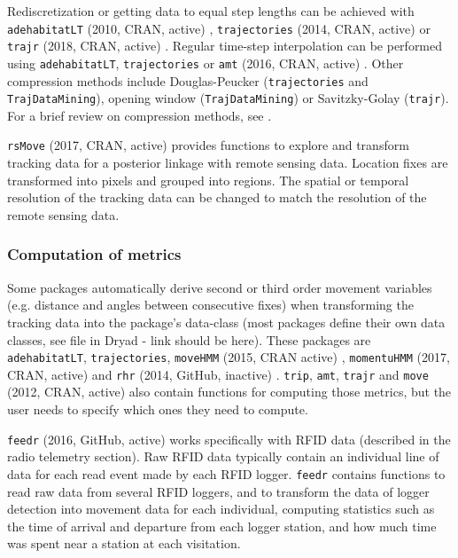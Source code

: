 \documentclass[a4paper,12pt]{article}
\newcommand{\Rpkg}[1]{\texttt{#1}}
\begin{document}
	Rediscretization or getting data to equal step lengths can be achieved with \Rpkg{adehabitatLT} (2010, CRAN, active) \citep{Calenge2006}, \Rpkg{trajectories} (2014, CRAN, active) \citep{Rtrajectories} or \Rpkg{trajr} (2018, CRAN, active) \citep{McLean2018}. Regular time-step interpolation can be performed using \Rpkg{adehabitatLT}, \Rpkg{trajectories} or \Rpkg{amt} (2016, CRAN, active) \citep{Ramt}. Other compression methods include Douglas-Peucker (\Rpkg{trajectories} and \Rpkg{TrajDataMining}), opening window (\Rpkg{TrajDataMining}) or Savitzky-Golay (\Rpkg{trajr}). For a brief review on compression methods, see \cite{Meratnia2004}.
	
	\Rpkg{rsMove} (2017, CRAN, active) \citep{RrsMove} provides functions to explore and transform tracking data for a posterior linkage with remote sensing data. Location fixes are transformed into pixels and grouped into regions. The spatial or temporal resolution of the tracking data can be changed to match the resolution of the remote sensing data. 
	
	\subsubsection*{Computation of metrics}
	
	Some packages automatically derive second or third order movement variables (e.g. distance and angles between consecutive fixes) when transforming the tracking data into the package's data-class (most packages define their own data classes, see file in Dryad - link should be here). These packages are \Rpkg{adehabitatLT}, \Rpkg{trajectories}, \Rpkg{moveHMM} (2015, CRAN active) \citep{Michelot2016}, \Rpkg{momentuHMM} (2017, CRAN, active) \citep{McClintock2018} and \Rpkg{rhr} (2014, GitHub, inactive) \citep{Rrhr}. \Rpkg{trip}, \Rpkg{amt}, \Rpkg{trajr} and \Rpkg{move} (2012, CRAN, active) \citep{Rmove} also contain functions for computing those metrics, but the user needs to specify which ones they need to compute. 
	
	\Rpkg{feedr} (2016, GitHub, active) \citep{Rfeedr} works specifically with RFID data (described in the radio telemetry section). Raw RFID data typically contain an individual line of data for each read event made by each RFID logger. \Rpkg{feedr} contains functions to read raw data from several RFID loggers, and to transform the data of logger detection into movement data for each individual, computing statistics such as the time of arrival and departure from each logger station, and how much time was spent near a station at each visitation. 
	
\end{document}
